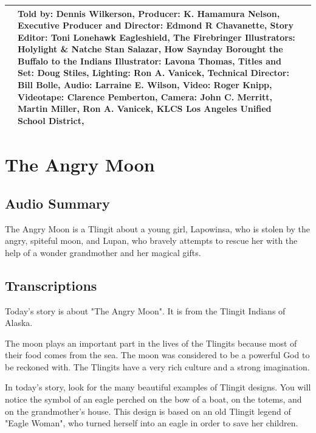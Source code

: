 \begin{table}[h]
\begin{small}
\begin{tabular}{|p{1.5cm}|p{8.5cm}|p{7cm}|}
                                 &
            Told by: Dennis Wilkerson,
            Producer: K. Hamamura Nelson,
            Executive Producer and Director: Edmond R Chavanette,
            Story Editor: Toni Lonehawk Eagleshield,
            The Firebringer Illustrators: Holylight \& Natche Stan Salazar,
            How Saynday Borought the Buffalo to the Indians Illustrator: Lavona Thomas,
            Titles and Set: Doug Stiles,
            Lighting: Ron A. Vanicek,
            Technical Director: Bill Bolle,
            Audio: Larraine E. Wilson,
            Video: Roger Knipp,
            Videotape: Clarence Pemberton,
            Camera: John C. Merritt, Martin Miller, Ron A. Vanicek,
            KLCS Los Angeles Unified School District,
            \\
            \hline
        \end{tabular}
    \end{small}

\end{table}

\clearpage
\newpage

\section{The Angry Moon}

\subsection{Audio Summary}

The Angry Moon is a Tlingit about a young girl, Lapowinsa, who is stolen by the angry, spiteful moon, and Lupan, who bravely attempts to rescue her with the help of a wonder grandmother and her magical gifts.

\subsection{Transcriptions}

Today's story is about "The Angry Moon". It is from the Tlingit Indians of Alaska.

The moon plays an important part in the lives of the Tlingits because most of their food comes from the sea. The moon was considered to be a powerful God to be reckoned with. The Tlingits have a very rich culture and a strong imagination.

In today's story, look for the many beautiful examples of Tlingit designs. You will notice the symbol of an eagle perched on the bow of a boat, on the totems, and on the grandmother's house. This design is based on an old Tlingit legend of "Eagle Woman", who turned herself into an eagle in order to save her children.

